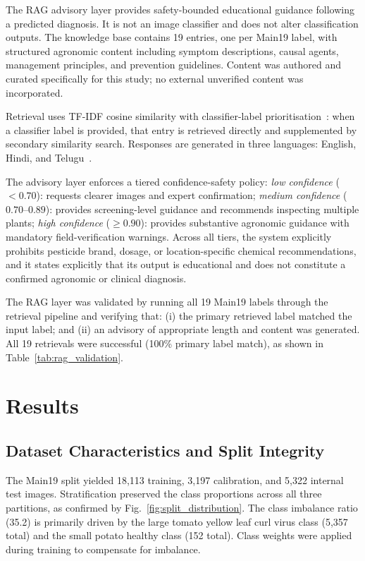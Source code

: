 \documentclass[conference]{IEEEtran}
\begin{document}
The RAG advisory layer provides safety-bounded educational guidance following
a predicted diagnosis. It is not an image classifier and does not alter
classification outputs. The knowledge base contains 19 entries, one per Main19
label, with structured agronomic content including symptom descriptions, causal
agents, management principles, and prevention guidelines. Content was authored
and curated specifically for this study; no external unverified content was
incorporated.

Retrieval uses TF-IDF cosine similarity with classifier-label
prioritisation~\cite{robertson2009bm25}: when a classifier label is provided,
that entry is retrieved directly and supplemented by secondary similarity search.
Responses are generated in three languages: English, Hindi, and Telugu~\cite{bird2009nlp}.

The advisory layer enforces a tiered confidence-safety policy:
\textit{low confidence} ($<0.70$): requests clearer images and expert
confirmation; \textit{medium confidence} ($0.70$--$0.89$): provides
screening-level guidance and recommends inspecting multiple plants;
\textit{high confidence} ($\geq 0.90$): provides substantive agronomic guidance
with mandatory field-verification warnings. Across all tiers, the system
explicitly prohibits pesticide brand, dosage, or location-specific chemical
recommendations, and it states explicitly that its output is educational and
does not constitute a confirmed agronomic or clinical diagnosis.

The RAG layer was validated by running all 19 Main19 labels through the retrieval
pipeline and verifying that: (i) the primary retrieved label matched the input
label; and (ii) an advisory of appropriate length and content was generated.
All 19 retrievals were successful (100\% primary label match), as shown in
Table~\ref{tab:rag_validation}.

\section{Results}

\subsection{Dataset Characteristics and Split Integrity}

The Main19 split yielded 18,113 training, 3,197 calibration, and 5,322 internal
test images. Stratification preserved the class proportions across all three
partitions, as confirmed by Fig.~\ref{fig:split_distribution}. The class
imbalance ratio (35.2) is primarily driven by the large tomato yellow leaf curl
virus class (5,357 total) and the small potato healthy class (152 total). Class
weights were applied during training to compensate for imbalance.
\end{document}
